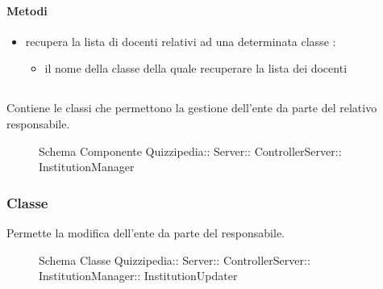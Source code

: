 \paragraph{Metodi}
\begin{itemize}
\item {}
\newline
recupera la lista di docenti relativi ad una determinata classe
\newline
{} :
\begin{itemize}
\item {}
\newline
il nome della classe della quale recuperare la lista dei docenti
\end{itemize}
\end{itemize}
\subsection{}
Contiene le classi che permettono la gestione dell'ente da parte del relativo responsabile.
\begin{figure}[H]
\centering
\noindent{}
\caption[Schema Componente Quizzipedia::Server::ControllerServer::InstitutionManager]{Schema Componente Quizzipedia:: Server:: ControllerServer:: InstitutionManager}
\end{figure}
\subsubsection{Classe }
Permette la modifica dell'ente da parte del responsabile.
\begin{figure}[H]
\centering
\noindent{}
\caption[Schema Classe InstitutionUpdater]{Schema Classe Quizzipedia:: Server:: ControllerServer:: InstitutionManager:: InstitutionUpdater}
\end{figure}
